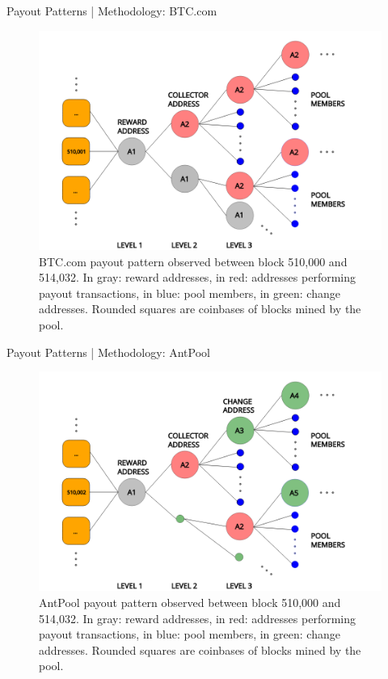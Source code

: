 \documentclass[10pt]{beamer}
\begin{document}
\begin{frame}[fragile]{Payout Patterns | Methodology: BTC.com}
    \begin{figure}
        \includegraphics[width=.8\textwidth]{images/flow_BTCcom_example1.png}
        \caption{BTC.com payout pattern observed between block 510,000 and 514,032. In gray: reward addresses, in red: addresses performing payout transactions, in blue: pool members, in green: change addresses. Rounded squares are coinbases of blocks mined by the pool.}
        \label{fig:flow_example}
    \end{figure}
\end{frame}

\begin{frame}[fragile]{Payout Patterns | Methodology: AntPool}
    \begin{figure}
        \includegraphics[width=.8\textwidth]{images/flow_AntPool_example1.png}
        \caption{AntPool payout pattern observed between block 510,000 and 514,032. In gray: reward addresses, in red: addresses performing payout transactions, in blue: pool members, in green: change addresses. Rounded squares are coinbases of blocks mined by the pool.}
        \label{fig:antpool_flow}
    \end{figure}
\end{frame}
\end{document}
